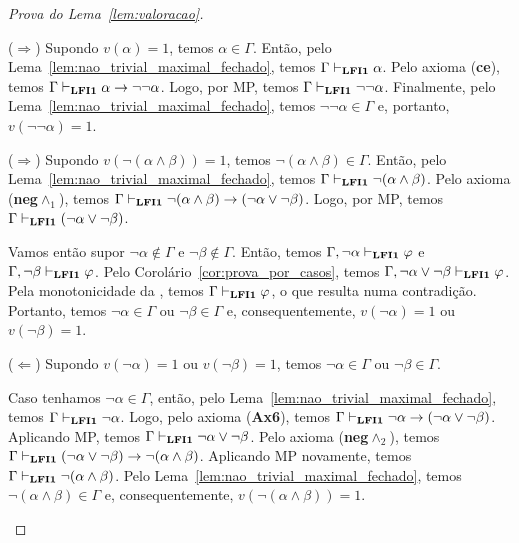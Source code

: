\begin{proof}[Prova do Lema~\ref{lem:valoracao}]
\begin{provaporcasos}
\begin{adjustwidth}{1cm}{}
                        \noindent ($\Longrightarrow$) Supondo $v(\alpha) = 1$, temos $\alpha \in \Gamma$. Então, pelo Lema~\ref{lem:nao_trivial_maximal_fechado}, temos $\Gamma \vdash_{{\normalfont\textbf{LFI1}}{}} \alpha$. Pelo axioma (\textbf{ce}), temos $\Gamma \vdash_{{\normalfont\textbf{LFI1}}{}} \alpha \to \neg \neg \alpha$. Logo, por MP, temos $\Gamma \vdash_{{\normalfont\textbf{LFI1}}{}} \neg \neg \alpha$. Finalmente, pelo Lema~\ref{lem:nao_trivial_maximal_fechado}, temos $\neg \neg \alpha \in \Gamma$ e, portanto, $v(\neg \neg \alpha) = 1$.

                    \end{adjustwidth}


                    \begin{adjustwidth}{1cm}{}
                        
                        \noindent ($\Longrightarrow$) Supondo $v(\neg (\alpha \land \beta)) = 1$, temos $\neg (\alpha \land \beta) \in \Gamma$. Então, pelo Lema~\ref{lem:nao_trivial_maximal_fechado}, temos $\Gamma \vdash_{{\normalfont\textbf{LFI1}}{}} \neg (\alpha \land \beta)$. Pelo axioma (\textbf{neg}$\land_1$), temos $\Gamma \vdash_{{\normalfont\textbf{LFI1}}{}} \neg (\alpha \land \beta) \to (\neg \alpha \lor \neg \beta)$. Logo, por MP, temos $\Gamma \vdash_{{\normalfont\textbf{LFI1}}{}} (\neg \alpha \lor \neg \beta)$.

                        \noindent Vamos então supor $\neg \alpha \not \in \Gamma$ e $\neg \beta \not \in \Gamma$. Então, temos $\Gamma, \neg \alpha \vdash_{{\normalfont\textbf{LFI1}}{}} \varphi$ e $\Gamma, \neg \beta \vdash_{{\normalfont\textbf{LFI1}}{}} \varphi$. Pelo Corolário~\ref{cor:prova_por_casos}, temos $\Gamma, \neg \alpha \lor \neg \beta \vdash_{{\normalfont\textbf{LFI1}}{}} \varphi$. Pela monotonicidade da \lfium{}, temos $\Gamma \vdash_{{\normalfont\textbf{LFI1}}{}} \varphi$, o que resulta numa contradição. Portanto, temos $\neg \alpha \in \Gamma$ ou $\neg \beta \in \Gamma$ e, consequentemente, $v(\neg \alpha) = 1$ ou $v(\neg \beta) = 1$.
                        
                        \noindent ($\Longleftarrow$) Supondo $v(\neg \alpha) = 1$ ou $v(\neg \beta) = 1$, temos $\neg \alpha \in \Gamma$ ou $\neg \beta \in \Gamma$.

                        \noindent Caso tenhamos $\neg \alpha \in \Gamma$, então, pelo Lema~\ref{lem:nao_trivial_maximal_fechado}, temos $\Gamma \vdash_{{\normalfont\textbf{LFI1}}{}} \neg \alpha$. Logo, pelo axioma (\textbf{Ax6}), temos $\Gamma \vdash_{{\normalfont\textbf{LFI1}}{}} \neg \alpha \to (\neg \alpha \lor \neg \beta)$. Aplicando MP, temos $\Gamma \vdash_{{\normalfont\textbf{LFI1}}{}} \neg \alpha \lor \neg \beta$. Pelo axioma (\textbf{neg}$\land_2$), temos $\Gamma \vdash_{{\normalfont\textbf{LFI1}}{}} (\neg \alpha \lor \neg \beta) \to \neg (\alpha \land \beta)$. Aplicando MP novamente, temos $\Gamma \vdash_{{\normalfont\textbf{LFI1}}{}} \neg (\alpha \land \beta)$. Pelo Lema~\ref{lem:nao_trivial_maximal_fechado}, temos $\neg (\alpha \land \beta) \in \Gamma$ e, consequentemente, $v(\neg (\alpha \land \beta)) = 1$.


\end{adjustwidth}
\end{provaporcasos}
\end{proof}

